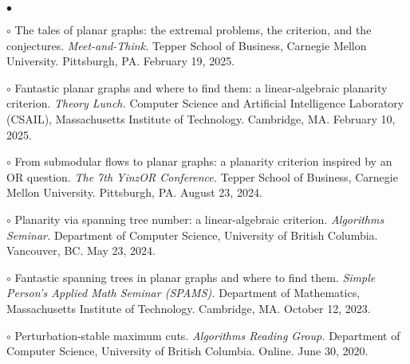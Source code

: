 \documentclass[margin,line]{res}
\newenvironment{list2}{
  \begin{list}{$\bullet$}{%
      \setlength{\itemsep}{0in}
      \setlength{\parsep}{0in} \setlength{\parskip}{0in}
      \setlength{\topsep}{0in} \setlength{\partopsep}{0in}
      \setlength{\leftmargin}{0.2in}}}{\end{list}}
\begin{document}
\begin{resume}
\begin{list2}
\item[$\circ$] The tales of planar graphs: the extremal problems, the criterion, and the conjectures. \emph{Meet-and-Think.} Tepper School of Business, Carnegie Mellon University. Pittsburgh, PA. February 19, 2025.
\item[$\circ$] Fantastic planar graphs and where to find them: a linear-algebraic planarity criterion. \emph{Theory Lunch.} Computer Science and Artificial Intelligence Laboratory (CSAIL), Massachusetts Institute of Technology. Cambridge, MA. February 10, 2025.
\item[$\circ$] From submodular flows to planar graphs: a planarity criterion inspired by an OR question. \emph{The 7th YinzOR Conference.} Tepper School of Business, Carnegie Mellon University. Pittsburgh, PA. August 23, 2024.
\item[$\circ$] Planarity via spanning tree number: a linear-algebraic criterion. \emph{Algorithms Seminar.} Department of Computer Science, University of British Columbia. Vancouver, BC. May 23, 2024.
\item[$\circ$] Fantastic spanning trees in planar graphs and where to find them. \emph{Simple Person's Applied Math Seminar (SPAMS).} Department of Mathematics, Massachusetts Institute of Technology. Cambridge, MA. October 12, 2023.
\item[$\circ$] Perturbation-stable maximum cuts. \emph{Algorithms Reading Group.} Department of Computer Science, University of British Columbia. Online. June 30, 2020.
\end{list2}




\end{resume}
\end{document}
